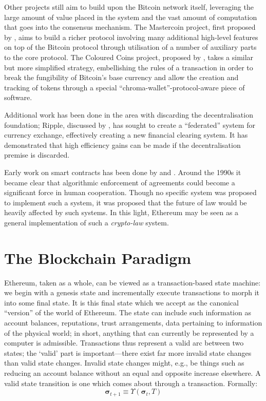 \documentclass[9pt,oneside]{amsart}
\makeatletter
\newcommand*\eg{e.g.\@\xspace}
\makeatother
\begin{document}
\begin{multicols}{2}
Other projects still aim to build upon the Bitcoin network itself, leveraging the large amount of value placed in the system and the vast amount of computation that goes into the consensus mechanism. The Mastercoin project, first proposed by \cite{mastercoin2013willett}, aims to build a richer protocol involving many additional high-level features on top of the Bitcoin protocol through utilisation of a number of auxiliary parts to the core protocol. The Coloured Coins project, proposed by \cite{colouredcoins2012rosenfeld}, takes a similar but more simplified strategy, embellishing the rules of a transaction in order to break the fungibility of Bitcoin's base currency and allow the creation and tracking of tokens through a special ``chroma-wallet''-protocol-aware piece of software.

Additional work has been done in the area with discarding the decentralisation foundation; Ripple, discussed by \cite{boutellier2014pirates}, has sought to create a ``federated'' system for currency exchange, effectively creating a new financial clearing system. It has demonstrated that high efficiency gains can be made if the decentralisation premise is discarded.

Early work on smart contracts has been done by \cite{szabo1997formalizing} and \cite{miller1997future}. Around the 1990s it became clear that algorithmic enforcement of agreements could become a significant force in human cooperation. Though no specific system was proposed to implement such a system, it was proposed that the future of law would be heavily affected by such systems. In this light, Ethereum may be seen as a general implementation of such a \textit{crypto-law} system.


\section{The Blockchain Paradigm} \label{ch:overview}

Ethereum, taken as a whole, can be viewed as a transaction-based state machine: we begin with a genesis state and incrementally execute transactions to morph it into some final state. It is this final state which we accept as the canonical ``version'' of the world of Ethereum. The state can include such information as account balances, reputations, trust arrangements, data pertaining to information of the physical world; in short, anything that can currently be represented by a computer is admissible. Transactions thus represent a valid arc between two states; the `valid' part is important---there exist far more invalid state changes than valid state changes. Invalid state changes might, \eg, be things such as reducing an account balance without an equal and opposite increase elsewhere. A valid state transition is one which comes about through a transaction. Formally:
\begin{equation}
\boldsymbol{\sigma}_{t+1} \equiv \Upsilon(\boldsymbol{\sigma}_t, T)
\end{equation}


\end{multicols}
\end{document}
